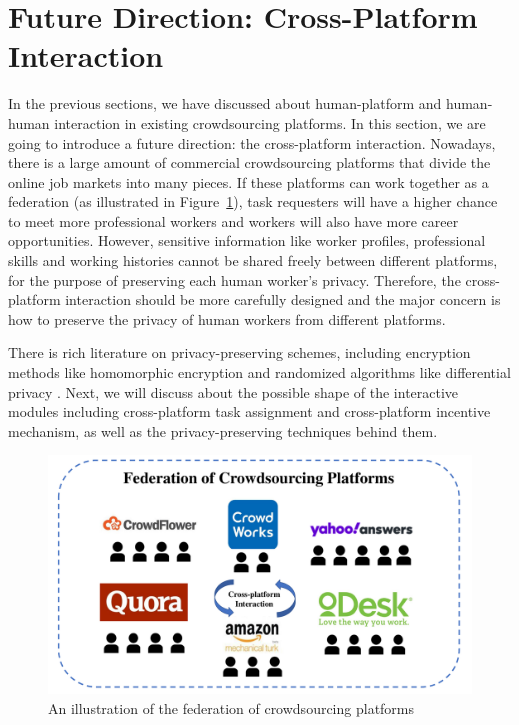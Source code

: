 \documentclass[11pt]{article}
\newcommand\figref[1]{Figure~\ref{#1}}
\begin{document}
\section{Future Direction: Cross-Platform Interaction}

In the previous sections, we have discussed about human-platform and human-human interaction in existing crowdsourcing platforms.
In this section, we are going to introduce a future direction: the cross-platform interaction.
Nowadays, there is a large amount of commercial crowdsourcing platforms that divide the online job markets into many pieces.
If these platforms can work together as a federation (as illustrated in \figref{fig:federation}), task requesters will have a higher chance to meet more professional workers and workers will also have more career opportunities.
However, sensitive information like worker profiles, professional skills and working histories cannot be shared freely between different platforms, for the purpose of preserving each human worker's privacy.
Therefore, the cross-platform interaction should be more carefully designed and the major concern is how to preserve the privacy of human workers from different platforms.

There is rich literature on privacy-preserving schemes, including encryption methods like homomorphic encryption \cite{FHE} and randomized algorithms like differential privacy \cite{ICALP06}.
Next, we will discuss about the possible shape of the interactive modules including cross-platform task assignment and cross-platform incentive mechanism, as well as the privacy-preserving techniques behind them.

\begin{figure}
	\centering
	\includegraphics[scale=0.45]{submissions/yongxin/figs/federation.pdf}
	
	\caption{An illustration of the federation of crowdsourcing platforms}
	\label{fig:federation}
\end{figure}
\end{document}
